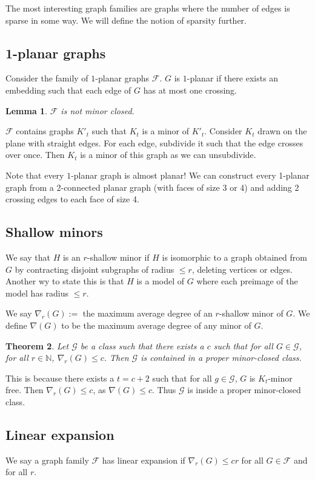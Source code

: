 \documentclass[]{article}
\newtheorem{theorem}{Theorem}
\newtheorem{lemma}[theorem]{Lemma}
\theoremstyle{definition}
\numberwithin{theorem}{section}
\numberwithin{equation}{section}
\begin{document}
The most interesting graph families are graphs where the number of edges is sparse in some way. We will define the notion of sparsity further. 

\subsection{1-planar graphs} 
Consider the family of $1$-planar graphs $\mathcal{F}$. $G$ is $1$-planar if there exists an embedding such that each edge of $G$ has at most one crossing. 
\begin{lemma}
	$\mathcal{F}$ is not minor closed.
\end{lemma}
$\mathcal{F}$ contains graphs $K'_t$ such that $K_t$ is a minor of $K'_t$. Consider $K_t$ drawn on the plane with straight edges. For each edge, subdivide it such that the edge crosses over once. Then $K_t$ is a minor of this graph as we can unsubdivide.

Note that every $1$-planar graph is almost planar! We can construct every 1-planar graph from a 2-connected planar graph (with faces of size 3 or 4) and adding 2 crossing edges to each face of size 4.
\subsection{Shallow minors}
We say that $H$ is an $r$-shallow minor if $H$ is isomorphic to a graph obtained from $G$ by contracting disjoint subgraphs of radius $\leq r$, deleting vertices or edges. Another wy to state this is that $H$ is a model of $G$ where each preimage of the model has radius $\leq r$. 

We say $\nabla_r(G) :=$ the maximum average degree of an $r$-shallow minor of $G$. 
We define $\nabla(G)$ to be the maximum average degree of any minor of $G$. 

\begin{theorem}
	Let $\mathcal{G}$ be a class such that there exists a $c$ such that for all $G \in \mathcal{G}$, for all $r \in \mathbb{N}$, $\nabla_r(G) \leq c$. Then $\mathcal{G}$ is contained in a proper minor-closed class. 
\end{theorem}
This is because there exists a $t = c + 2$ such that for all $g \in \mathcal{G}$, $G$ is $K_t$-minor free. 
Then $\nabla_r(G) \leq c$, as $\nabla(G) \leq c$. 
Thus $\mathcal{G}$ is inside a proper minor-closed class. 

\subsection{Linear expansion}
We say a graph family $\mathcal{F}$ has linear expansion if $\nabla_r(G) \leq cr$ for all $G \in \mathcal{F}$ and for all $r$. 
\end{document}
